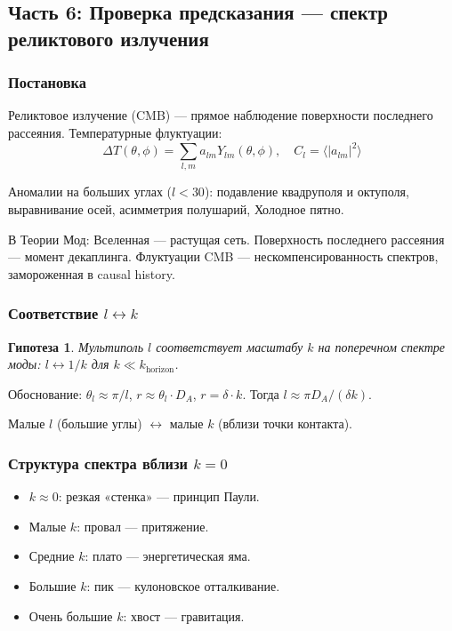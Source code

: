 \documentclass[12pt,a4paper]{article}
\newtheorem{hypothesis}{Гипотеза}[section]
\begin{document}
\subsection{Часть 6: Проверка предсказания --- спектр реликтового излучения}

\subsubsection{Постановка}

Реликтовое излучение (CMB) --- прямое наблюдение поверхности последнего рассеяния. Температурные флуктуации:
\begin{equation}
    \Delta T(\theta, \phi) = \sum_{l,m} a_{lm} Y_{lm}(\theta, \phi), \quad C_l = \langle |a_{lm}|^2 \rangle
\end{equation}

Аномалии на больших углах ($l < 30$): подавление квадруполя и октуполя, выравнивание осей, асимметрия полушарий, Холодное пятно.

В Теории Мод: Вселенная --- растущая сеть. Поверхность последнего рассеяния --- момент декаплинга. Флуктуации CMB --- нескомпенсированность спектров, замороженная в causal history.

\subsubsection{Соответствие $l \leftrightarrow k$}

\begin{hypothesis}
Мультиполь $l$ соответствует масштабу $k$ на поперечном спектре моды: $l \leftrightarrow 1/k$ для $k \ll k_{\text{horizon}}$.
\end{hypothesis}

Обоснование: $\theta_l \approx \pi/l$, $r \approx \theta_l \cdot D_A$, $r = \delta \cdot k$. Тогда $l \approx \pi D_A / (\delta k)$.

Малые $l$ (большие углы) $\leftrightarrow$ малые $k$ (вблизи точки контакта).

\subsubsection{Структура спектра вблизи $k = 0$}

\begin{itemize}
    \item $k \approx 0$: резкая «стенка» --- принцип Паули.
    \item Малые $k$: провал --- притяжение.
    \item Средние $k$: плато --- энергетическая яма.
    \item Большие $k$: пик --- кулоновское отталкивание.
    \item Очень большие $k$: хвост --- гравитация.
\end{itemize}
\end{document}
